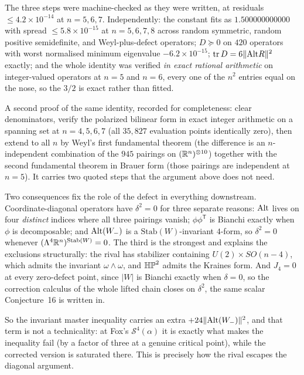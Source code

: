 \begin{certificate}
The three steps were machine-checked as they were written, at residuals $\le4.2\times10^{-14}$ at $n=5,6,7$. Independently: the constant fits as $1.500000000000$ with spread $\le5.8\times10^{-15}$ at $n=5,6,7,8$ across random symmetric, random positive semidefinite, and Weyl-plus-defect operators; $D\succeq0$ on $420$ operators with worst normalised minimum eigenvalue $-6.2\times10^{-15}$; $\operatorname{tr} D=6\|\mathrm{Alt} R\|^2$ exactly; and the whole identity was verified \emph{in exact rational arithmetic} on integer-valued operators at $n=5$ and $n=6$, every one of the $n^2$ entries equal on the nose, so the $3/2$ is exact rather than fitted.

A second proof of the same identity, recorded for completeness: clear denominators, verify the polarized bilinear form in exact integer arithmetic on a spanning set at $n=4,5,6,7$ (all $35{,}827$ evaluation points identically zero), then extend to all $n$ by Weyl's first fundamental theorem (the difference is an $n$-independent combination of the $945$ pairings on $(\mathbb{R}^n)^{\otimes10}$) together with the second fundamental theorem in Brauer form (those pairings are independent at $n=5$). It carries two quoted steps that the argument above does not need.
\end{certificate}

Two consequences fix the role of the defect in everything downstream. Coordinate-diagonal operators have $\delta^2=0$ for three separate reasons: $\mathrm{Alt}$ lives on four \emph{distinct} indices where all three pairings vanish; $\phi\phi^{\mathsf T}$ is Bianchi exactly when $\phi$ is decomposable; and $\mathrm{Alt}(W_-)$ is a $\mathrm{Stab}(W)$-invariant $4$-form, so $\delta^2=0$ whenever $(\Lambda^4\mathbb{R}^n)^{\mathrm{Stab}(W)}=0$. The third is the strongest and explains the exclusions structurally: the rival has stabilizer containing $U(2)\times SO(n-4)$, which admits the invariant $\omega\wedge\omega$, and $\mathbb{HP}^2$ admits the Kraines form. And $J_4=0$ at every zero-defect point, since $|W|$ is Bianchi exactly when $\delta=0$, so the correction calculus of the whole lifted chain closes on $\delta^2$, the same scalar Conjecture~16 is written in.

So the invariant master inequality carries an extra $+24\|\mathrm{Alt}(W_-)\|^2$, and that term is not a technicality: at Fox's $\mathcal S^4(\alpha)$ it is exactly what makes the inequality fail (by a factor of three at a genuine critical point), while the corrected version is saturated there. This is precisely how the rival escapes the diagonal argument.

